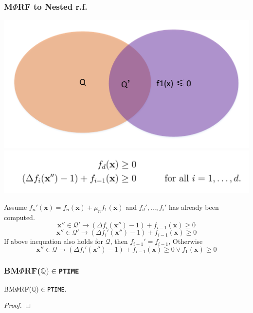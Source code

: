 \documentclass[11pt]{beamer}
\begin{document}
\begin{frame}\frametitle{M$\Phi$RF to Nested r.f.}
\begin{center}
\includegraphics[scale = 0.3]{1.pdf}
\includegraphics[scale = 0.2]{6.PNG}
\end{center}

Assume $f_{n}'(\textbf{x})= f_{n}(\textbf{x}) + \mu_{n}f_1(\textbf{x})$ and $f_d', \ldots, f_{i}'$ has already been computed.
\[\textbf{x}''\in \mathcal{Q}' \rightarrow (\Delta f_i(\textbf{x}'') - 1) + f_{i-1}(\textbf{x}) \ge 0\]
\[\textbf{x}''\in \mathcal{Q}' \rightarrow (\Delta f_i'(\textbf{x}'') - 1) + f_{i-1}(\textbf{x}) \ge 0\]
If above inequation also holds for $\mathcal{Q}$, then $f_{i-1}' = f_{i-1}$, Otherwise
\[\textbf{x}''\in \mathcal{Q} \rightarrow (\Delta f_i'(\textbf{x}'') - 1) + f_{i-1}(\textbf{x}) \ge 0 \vee f_1(\textbf{x}) \ge 0\]


\end{frame}

\begin{frame}\frametitle{BM$\Phi$RF($\mathbb{Q})\in$\texttt{PTIME}}
\begin{theorem}[2]
BM$\Phi$RF($\mathbb{Q}$)$\in$\texttt{PTIME}.



\end{theorem}

\begin{proof}


\end{proof}
\end{frame}
\end{document}
